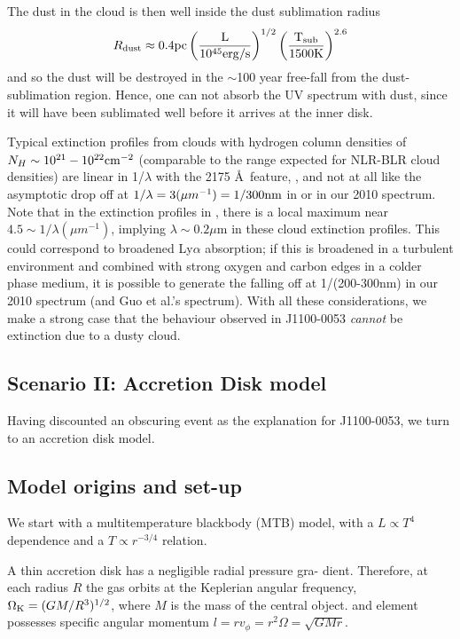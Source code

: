 \documentclass[11pt,a4paper]{article}
\begin{document}
The dust in the cloud is then well inside the dust sublimation radius
\begin{equation}
    R_{\rm dust} \approx 0.4\rm{pc}\left(\frac{L}{10^{45}\rm{erg/s}}\right)^{1/2}
                                                   \left(\frac{T_{\rm sub}}{1500\rm{K}}\right)^{2.6}
\end{equation}
and so the dust will be destroyed in the $\sim$100 year free-fall from
the dust-sublimation region. Hence, one can not absorb the UV spectrum
with dust, since it will have been sublimated well before it arrives
at the inner disk.

Typical extinction profiles from clouds with hydrogen column densities
of $N_{H} \sim 10^{21}-10^{22} \rm{cm}^{-2}$ (comparable to the range
expected for NLR-BLR cloud densities) are linear in 
1/$\lambda$ with the 2175 \AA\ feature, \citep[e.g., Figure 4
of][]{Gordon2003}, and not at all like the asymptotic drop off at
$1/\lambda=3 (\mu m^{-1})=1/300\rm{nm}$ in \citet{Guo2016} or in our
2010 spectrum. Note that in the extinction profiles in
\citet{Gordon2003}, there is a local maximum near $4.5 \sim 1/\lambda (\mu
m^{-1})$, implying $\lambda \sim 0.2\mu$m in these
cloud extinction profiles. %
This could correspond to broadened Ly$\alpha$ absorption;
if this is broadened in a turbulent environment and combined with
strong oxygen and carbon edges in a colder phase medium, it is possible to
generate the falling off at 1/(200-300nm) in our 2010 spectrum (and
Guo et al.'s spectrum). With all these considerations, we make a strong case
that the behaviour observed in J1100-0053 \emph{cannot} be extinction due
to a dusty cloud.


\subsection*{Scenario II: Accretion Disk model}
Having discounted an obscuring event as the explanation for J1100-0053,
we turn to an accretion disk model.

\subsection{Model origins and set-up}
We start with a multitemperature blackbody (MTB) model, with a $L
\propto T^4$ dependence and a $T \propto r^{-3/4}$ relation.

A thin accretion disk has a negligible radial pressure gra-
dient. Therefore, at each radius $R$ the gas orbits at the Keplerian
angular frequency, $\Omega_{\rm K} = (GM/R^{3})^{1/2}$, where $M$ is
the mass of the central object.  and element possesses specific
angular momentum $l = r v_{\phi} = r^{2} \Omega = \sqrt{GMr}$.
\end{document}
